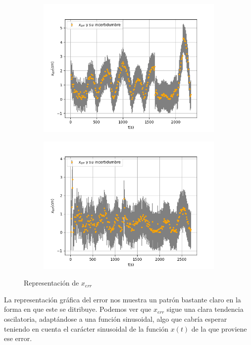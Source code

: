 \documentclass[a4paper,12pt,titlepage]{article}
\begin{document}
\begin{figure}[h!]
    \centering
    \begin{subfigure}{0.49\textwidth}
        \centering
        \includegraphics[width=0.95\linewidth]{Images/error1.png}
    \end{subfigure}
    \begin{subfigure}{0.49\textwidth}
        \centering
        \includegraphics[width=0.95\linewidth]{Images/error2.png}
    \end{subfigure}
    \caption{Representación de $x_{err}$}
\end{figure}

La representación gráfica del error nos muestra un patrón bastante claro en la forma en que este se ditribuye. Podemos ver que $x_{err}$ sigue una clara tendencia oscilatoria, adaptándose a una función sinusoidal, algo que cabría esperar teniendo en cuenta el carácter sinusoidal de la función $x(t)$ de la que proviene ese error.
\end{document}
